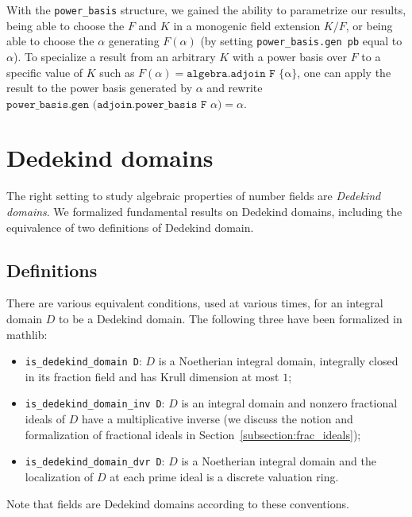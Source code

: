 \documentclass[a4paper,USenglish,cleveref, autoref, thm-restate]{lipics-v2021}
\newcommand{\lean}[1]{\texttt{#1}\xspace} %
\newcommand{\mathlib}{\textsf{mathlib}\xspace}
\begin{document}
With the \lean{power\_basis} structure, we gained the ability to parametrize our results,
being able to choose the $F$ and $K$ in a monogenic field extension $K / F$, or being able to choose the $\alpha$ generating $F(\alpha)$ (by setting \lean{power\_basis.gen\ pb} equal to $\alpha$).
To specialize a result from an arbitrary $K$ with a power basis over $F$ to a specific value of $K$ such as $F(\alpha) = \lean{algebra.adjoin F \{α\}}$,
one can apply the result to the power basis generated by $\alpha$ and rewrite $\lean{power\_basis.gen (adjoin.power\_basis F $\alpha$)} = \alpha$.


\section{Dedekind domains} \label{sec:Dedekind-domain}
The right setting to study algebraic properties of number fields are \emph{Dedekind domains}.
We formalized fundamental results on Dedekind domains, including the equivalence of two definitions of Dedekind domain.

\subsection{Definitions}\label{subsec:definitions_DD}
There are various equivalent conditions, used at various times, for an integral domain $D$ to be a Dedekind domain.
The following three have been formalized in \mathlib:
\begin{itemize}
\item \lean{is\_dedekind\_domain D}: $D$ is a Noetherian integral domain, integrally closed in its fraction field and has Krull dimension at most $1$;
\item \lean{is\_dedekind\_domain\_inv D}: $D$ is an integral domain and nonzero fractional ideals of $D$ have a multiplicative inverse (we discuss the notion and formalization of fractional ideals in Section~\ref{subsection:frac_ideals});
\item \lean{is\_dedekind\_domain\_dvr D}: $D$ is a Noetherian integral domain and the localization of $D$ at each prime ideal is a discrete valuation ring.
\end{itemize}
Note that fields are Dedekind domains according to these conventions.
\end{document}
